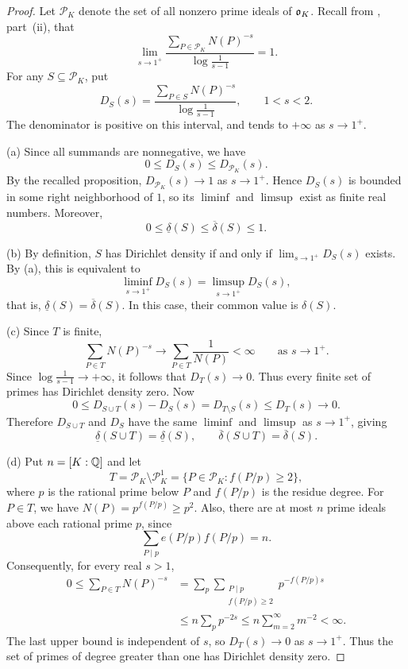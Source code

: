 \begin{proof}
  Let $\mathscr{P}_K$ denote the set of all nonzero prime ideals of $\mathfrak{o}_K$.
  Recall from , part~(ii), that
  \[
    \lim_{s \to 1^+}
    \frac{\sum_{P \in \mathscr{P}_K} N(P)^{-s}}{\log\frac{1}{s-1}} = 1.
  \]
  For any $S \subseteq \mathscr{P}_K$, put
  \[
    D_S(s) = \frac{\sum_{P \in S} N(P)^{-s}}{\log\frac{1}{s-1}},
    \qquad 1 < s < 2.
  \]
  The denominator is positive on this interval, and tends to $+\infty$ as
  $s \to 1^+$.

  (a) Since all summands are nonnegative, we have
  \[
    0 \le D_S(s) \le D_{\mathscr{P}_K}(s).
  \]
  By the recalled proposition, $D_{\mathscr{P}_K}(s) \to 1$ as $s \to 1^+$.
  Hence $D_S(s)$ is bounded in some right neighborhood of $1$, so its
  $\liminf$ and $\limsup$ exist as finite real numbers. Moreover,
  \[
    0 \le \underline{\delta}(S) \le \overline{\delta}(S) \le 1.
  \]

  (b) By definition, $S$ has Dirichlet density if and only if
  $\lim_{s \to 1^+} D_S(s)$ exists. By (a), this is equivalent to
  \[
    \liminf_{s \to 1^+} D_S(s) = \limsup_{s \to 1^+} D_S(s),
  \]
  that is, $\underline{\delta}(S) = \overline{\delta}(S)$. In this case,
  their common value is $\delta(S)$.

  (c) Since $T$ is finite,
  \[
    \sum_{P \in T} N(P)^{-s}
    \longrightarrow \sum_{P \in T} \frac{1}{N(P)} < \infty
    \qquad \text{as } s \to 1^+.
  \]
  Since $\log\frac{1}{s-1} \to +\infty$, it follows that $D_T(s) \to 0$.
  Thus every finite set of primes has Dirichlet density zero. Now
  \[
    0 \le D_{S \cup T}(s) - D_S(s)
    = D_{T \setminus S}(s) \le D_T(s) \longrightarrow 0.
  \]
  Therefore $D_{S \cup T}$ and $D_S$ have the same $\liminf$ and $\limsup$
  as $s \to 1^+$, giving
  \[
    \underline{\delta}(S \cup T) = \underline{\delta}(S),
    \qquad
    \overline{\delta}(S \cup T) = \overline{\delta}(S).
  \]

  (d) Put $n = [K : \mathbb{Q}]$ and let
  \[
    T = \mathscr{P}_K \setminus \mathscr{P}_K^1
      = \{P \in \mathscr{P}_K : f(P/p) \ge 2\},
  \]
  where $p$ is the rational prime below $P$ and $f(P/p)$ is the residue
  degree. For $P \in T$, we have $N(P) = p^{f(P/p)} \ge p^2$.
  Also, there are at most $n$ prime ideals above each rational prime $p$,
  since
  \[
    \sum_{P \mid p} e(P/p) f(P/p) = n.
  \]
  Consequently, for every real $s > 1$,
  \begin{align*}
    0 \le \sum_{P \in T} N(P)^{-s}
    &= \sum_p \sum_{\substack{P \mid p \\ f(P/p) \ge 2}}
      p^{-f(P/p)s} \\
    &\le n \sum_p p^{-2s}
    \le n \sum_{m=2}^{\infty} m^{-2} < \infty.
  \end{align*}
  The last upper bound is independent of $s$, so $D_T(s) \to 0$ as
  $s \to 1^+$. Thus the set of primes of degree greater than one has
  Dirichlet density zero.


\end{proof}
